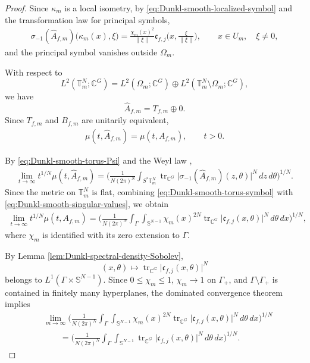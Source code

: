 \documentclass{amsart}
\begin{document}
\begin{proof}
Since \(\kappa_m\) is a local isometry, by
\eqref{eq:Dunkl-smooth-localized-symbol} and the transformation law for principal symbols,
\begin{align}
\sigma_{-1}(\widehat A_{f,m})
\big(
\kappa_m(x),\xi
\big)
=
\frac{\chi_m(x)^2}{\|\xi\|}
\mathfrak c_{f,j}
\bigg(
x,\frac{\xi}{\|\xi\|}
\bigg),
\qquad
x\in U_m,\quad \xi\neq0,
\label{eq:Dunkl-smooth-torus-symbol}
\end{align}
and the principal symbol vanishes outside \(\Omega_m\).

With respect to
\[
L^2(\mathbb T_m^N;\mathbb C^G)
=
L^2(\Omega_m;\mathbb C^G)
\oplus
L^2(\mathbb T_m^N\setminus\Omega_m;\mathbb C^G),
\]
we have
\[
\widehat A_{f,m}=T_{f,m}\oplus0.
\]
Since \(T_{f,m}\) and \(B_{f,m}\) are unitarily equivalent,
\begin{align}
\mu(t,\widehat A_{f,m})
=
\mu(t,A_{f,m}),
\qquad
t>0.
\label{eq:Dunkl-smooth-singular-values}
\end{align}

By \eqref{eq:Dunkl-smooth-torus-Psi} and the Weyl law
\cite[Theorem~6.1]{MR4592885},
\begin{align*}
\lim_{t\to\infty}
t^{1/N}\mu(t,\widehat A_{f,m})
=
\Bigg(
\frac{1}{N(2\pi)^N}
\int_{S^*\mathbb T_m^N}
\operatorname{tr}_{\mathbb C^G}
\big|
\sigma_{-1}(\widehat A_{f,m})(z,\theta)
\big|^N
\,dz\,d\theta
\Bigg)^{1/N}.
\end{align*}
Since the metric on \(\mathbb T_m^N\) is flat, combining
\eqref{eq:Dunkl-smooth-torus-symbol} with
\eqref{eq:Dunkl-smooth-singular-values}, we obtain
\begin{align}
\lim_{t\to\infty}
t^{1/N}\mu(t,A_{f,m})
=
\Bigg(
\frac{1}{N(2\pi)^N}
\int_\Gamma
\int_{\mathbb S^{N-1}}
\chi_m(x)^{2N}
\operatorname{tr}_{\mathbb C^G}
\big|
\mathfrak c_{f,j}(x,\theta)
\big|^N
\,d\theta\,dx
\Bigg)^{1/N},
\label{eq:Dunkl-smooth-localized-Weyl}
\end{align}
where \(\chi_m\) is identified with its zero extension to \(\Gamma\).

By Lemma \ref{lem:Dunkl-spectral-density-Sobolev},
\[
(x,\theta)
\longmapsto
\operatorname{tr}_{\mathbb C^G}
\big|
\mathfrak c_{f,j}(x,\theta)
\big|^N
\]
belongs to \(L^1(\Gamma\times\mathbb S^{N-1})\). Since
\(0\leq\chi_m\leq1\), \(\chi_m\to1\) on \(\Gamma_+\), and
\(\Gamma\setminus\Gamma_+\) is contained in finitely many hyperplanes, the dominated convergence theorem implies
\begin{align}
&\lim_{m\to\infty}
\Bigg(
\frac{1}{N(2\pi)^N}
\int_\Gamma
\int_{\mathbb S^{N-1}}
\chi_m(x)^{2N}
\operatorname{tr}_{\mathbb C^G}
\big|
\mathfrak c_{f,j}(x,\theta)
\big|^N
\,d\theta\,dx
\Bigg)^{1/N}
\nonumber\\
&\qquad=
\Bigg(
\frac{1}{N(2\pi)^N}
\int_\Gamma
\int_{\mathbb S^{N-1}}
\operatorname{tr}_{\mathbb C^G}
\big|
\mathfrak c_{f,j}(x,\theta)
\big|^N
\,d\theta\,dx
\Bigg)^{1/N}.
\label{eq:Dunkl-smooth-symbol-limit}
\end{align}


\end{proof}
\end{document}
